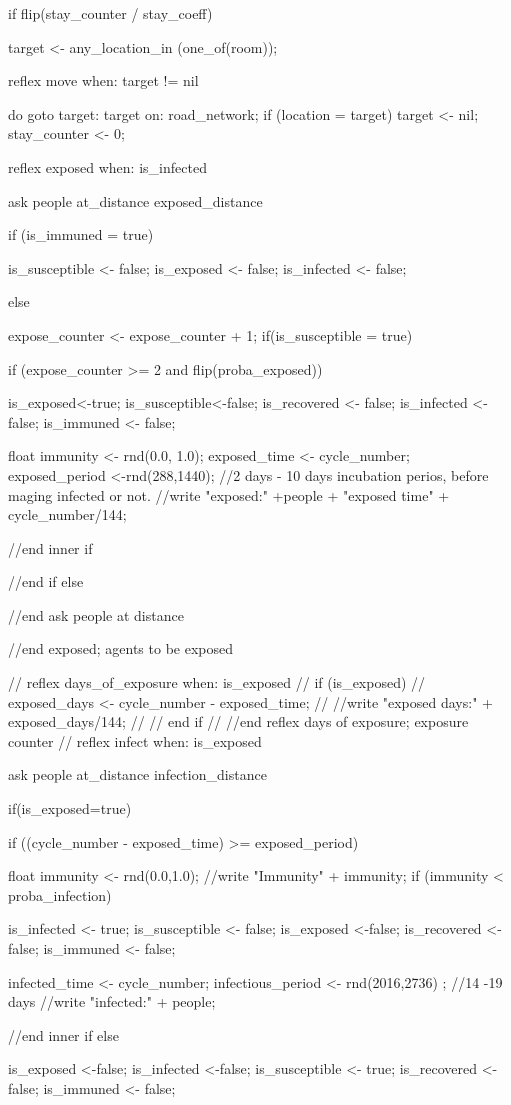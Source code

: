 \begin{verbatimtab}[4]
{{{			if flip(stay_counter / stay_coeff) {
			target <- any_location_in (one_of(room));
		
		}
			
	}

	reflex move when: target != nil {
		do goto target: target on: road_network;
		if (location = target) {
			target <- nil;
			stay_counter <- 0;
		}

	}
	 
reflex exposed when: is_infected{
			ask people at_distance exposed_distance {
				if (is_immuned = true){
					
					is_susceptible <- false;
					is_exposed <- false;
					is_infected <- false;
				}else {
					expose_counter <- expose_counter + 1;
					if(is_susceptible = true){
						if (expose_counter >= 2 and flip(proba_exposed)){
						is_exposed<-true;
						is_susceptible<-false;
						is_recovered <- false;
						is_infected <- false;
						is_immuned <- false;
						
						float immunity <- rnd(0.0, 1.0);
				   		exposed_time <- cycle_number;
				   		exposed_period <-rnd(288,1440); //2 days - 10 days incubation perios,
				   		 before maging infected or not.
				   		//write "exposed:" +people + "exposed time" + cycle_number/144;
						} //end inner if
					}
				} //end if else
				
				
					
			 }//end ask people at distance
		}//end exposed; agents to be exposed
		   
//		reflex days_of_exposure when: is_exposed {
//			if (is_exposed){
//		   		exposed_days <- cycle_number - exposed_time;
//		   		//write "exposed days:" + exposed_days/144;
//		   	}// end if	
//		}//end reflex days of exposure; exposure counter 
//			
		reflex infect when: is_exposed {
			ask people at_distance infection_distance {
				if(is_exposed=true){
					if ((cycle_number - exposed_time) >= exposed_period){
					float immunity <- rnd(0.0,1.0);
					//write "Immunity" + immunity;
					if (immunity < proba_infection) {
						is_infected <- true;
						is_susceptible <- false;
						is_exposed <-false;
						is_recovered <-false;
						is_immuned <- false;
						
						infected_time <- cycle_number;
						infectious_period <- rnd(2016,2736) ; //14 -19  days
						//write "infected:" + people;
					}//end inner if
					else {
						is_exposed <-false;
						is_infected <-false;
						is_susceptible <- true;
						is_recovered <-false;
						is_immuned <- false; 
						
}}}}}}}
\end{verbatimtab}
